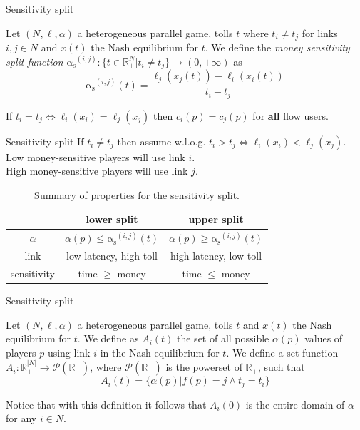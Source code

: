\documentclass{beamer}
\newcommand{\as}{\mathrm{\alpha_s}}
\newcommand{\R}{\mathbb{R}}
\begin{document}
\begin{frame}{Sensitivity split}
	\begin{definition}
		Let $(N, \ell, \alpha)$ a heterogeneous parallel game, tolls $t$ where $t_i \ne t_j$ for links $i, j \in N$ and $x(t)$ the Nash equilibrium for $t$.
		We define the \textit{money sensitivity split function} $\as^{(i, j)}: \{t \in \R_+^N|t_i \ne t_j\} \rightarrow (0, +\infty)$ as
		\[\as^{(i, j)}(t) = \frac{\ell_j(x_j(t)) - \ell_i(x_i(t))}{t_i - t_j}\]
	\end{definition}
	If $t_i = t_j \Leftrightarrow \ell_i(x_i) = \ell_j(x_j)$ then $c_i(p) = c_j(p)$ for \textbf{all} flow users.
\end{frame}

\begin{frame}{Sensitivity split}
	If $t_i \ne t_j$ then assume w.l.o.g. $t_i > t_j \Leftrightarrow \ell_i(x_i) < \ell_j(x_j)$.\\
	Low money-sensitive players will use link $i$.\\
	High money-sensitive players will use link $j$.

	\begin{table}[h!]
		\centering
		\caption{Summary of properties for the sensitivity split.}
		\begin{tabular}{| c || c | c |}
			\hline
			& \textbf{lower split} & \textbf{upper split} \\ \hline
			$\alpha$ & $\alpha(p) \le \as^{(i, j)}(t)$ & $\alpha(p) \ge \as^{(i, j)}(t)$ \\ \hline
			link & low-latency, high-toll & high-latency, low-toll \\ \hline
			sensitivity & time $\ge$ money & time $\le$ money \\ \hline
		\end{tabular}
		\label{table:split_summary}
	\end{table}
\end{frame}

\begin{frame}{Sensitivity split}
	\begin{definition}
		\label{definition:alpha_flow_sets}
		Let $(N, \ell, \alpha)$ a heterogeneous parallel game, tolls $t$ and $x(t)$ the Nash equilibrium for $t$.
		We define as $A_i(t)$ the set of all possible $\alpha(p)$ values of players $p$ using link $i$ in the Nash equilibrium for $t$.
		We define a set function $A_i: \R_+^{|N|} \rightarrow \mathcal{P}(\R_+)$, where $\mathcal{P}(\R_+)$ is the powerset of $\R_+$, such that
		\[A_i(t) = \{\alpha(p) | f(p) = j \wedge t_j = t_i\}\]
	\end{definition}

	Notice that with this definition it follows that $A_i(0)$ is the entire domain of $\alpha$ for any $i \in N$.
\end{frame}
\end{document}
